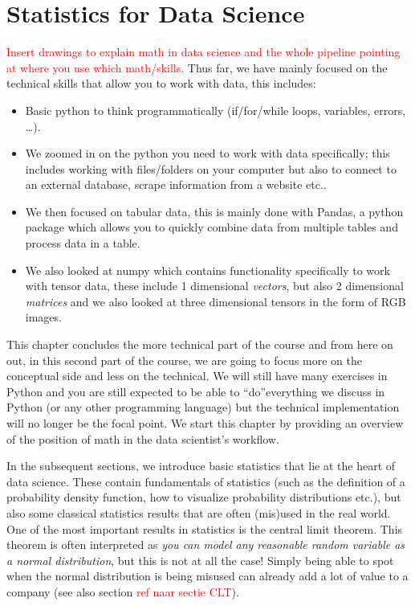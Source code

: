 \documentclass[10pt]{extarticle}
\newcommand{\<}{\langle}
\renewcommand{\>}{\rangle}
\newcommand\todo[1]{\textcolor{red}{#1}}
\theoremstyle{mystyle}{\newtheorem*{remark}{Remark}}
\theoremstyle{mystyle}{\newtheorem*{remarks}{Remarks}}
\theoremstyle{mystyle}{\newtheorem*{example}{Example}}
\theoremstyle{mystyle}{\newtheorem*{examples}{Examples}}
\theoremstyle{definition}{\newtheorem*{exercise}{Exercise}}
\theoremstyle{warn}
\begin{document}
\section{Statistics for Data Science}
\todo{Insert drawings to explain math in data science and the whole pipeline pointing at where you use which math/skills.}
Thus far, we have mainly focused on the technical skills that allow you to work with data, this includes:
\begin{itemize}
\item Basic python to think programmatically (if/for/while loops, variables, errors, \dots). 
\item We zoomed in on the python you need to work with data specifically; this includes working with files/folders on your computer but also to connect to an external database, scrape information from a website etc..
\item We then focused on tabular data, this is mainly done with Pandas, a python package which allows you to quickly combine data from multiple tables and process data in a table.
\item We also looked at numpy which contains functionality specifically to work with tensor data, these include 1 dimensional \textit{vectors}, but also 2 dimensional \textit{matrices} and we also looked at three dimensional tensors in the form of RGB images.
\end{itemize}
This chapter concludes the more technical part of the course and from here on out, in this second part of the course, we are going to focus more on the conceptual side and less on the technical. We will still have many exercises in Python and you are still expected to be able to \textquotedblleft do\textquotedblright  everything we discuss in Python (or any other programming language) but the technical implementation will no longer be the focal point. We start this chapter by providing an overview of the position of math in the data scientist's workflow. 

In the subsequent sections, we introduce basic statistics that lie at the heart of data science. These contain fundamentals of statistics (such as the definition of a probability density function, how to visualize probability distributions etc.), but also some classical statistics results that are often (mis)used in the real world. One of the most important results in statistics is the central limit theorem. This theorem is often interpreted as \textit{you can model any reasonable random variable as a normal distribution}, but this is not at all the case! Simply being able to spot when the normal distribution is being misused can already add a lot of value to a company (see also section \todo{ref naar sectie CLT}).
\end{document}
